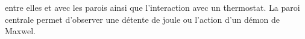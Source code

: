 entre elles et avec les parois ainsi que l'interaction avec un thermostat.
%
La paroi centrale permet d'observer une détente de joule ou l'action d'un démon de Maxwel.
%

